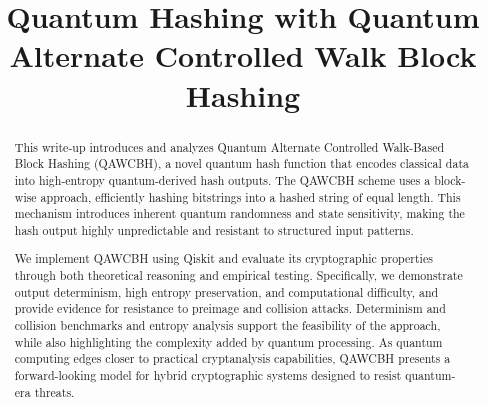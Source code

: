 \documentclass[conference]{IEEEtran}
\begin{document}
\title{Quantum Hashing with Quantum Alternate Controlled Walk Block Hashing\\

}

\author{
\and

\and

\and

\and

\and


}

\maketitle

\begin{abstract}
This write-up introduces and analyzes Quantum Alternate Controlled Walk-Based Block Hashing (QAWCBH), a novel quantum hash function that encodes classical data into high-entropy quantum-derived hash outputs. The QAWCBH scheme uses a block-wise approach, efficiently hashing bitstrings into a hashed string of equal length. This mechanism introduces inherent quantum randomness and state sensitivity, making the hash output highly unpredictable and resistant to structured input patterns.

We implement QAWCBH using Qiskit and evaluate its cryptographic properties through both theoretical reasoning and empirical testing. Specifically, we demonstrate output determinism, high entropy preservation, and computational difficulty, and provide evidence for resistance to preimage and collision attacks. Determinism and collision benchmarks and entropy analysis support the feasibility of the approach, while also highlighting the complexity added by quantum processing. As quantum computing edges closer to practical cryptanalysis capabilities, QAWCBH presents a forward-looking model for hybrid cryptographic systems designed to resist quantum-era threats.
\end{abstract}
\end{document}
